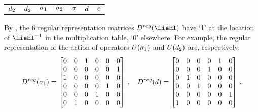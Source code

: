 {\begin{table}[h]
\begin{center}
\begin{tabular}{c | c c c c c c}
      $d_2$ & $d_2$ & $\sigma_1$ & $\sigma_2$ & $\sigma$ & $d$ & $e$
    \end{tabular}
  \end{center}
\end{table}
  By , the 6 regular representation matrices
  $D^{reg}(\LieEl)$ have `1' at the location of $\LieEl^{-1}$
  in the multiplication table, `0' elsewhere.
  For example, the regular representation of the action of
  operators $U(\sigma_1)$ and
  $U(d_2)$ are, respectively:
  \[
    D^{reg}(\sigma_1) =
    \begin{bmatrix}
      0 & 0 & 1 & 0 & 0 & 0 \\
      0 & 0 & 0 & 0 & 0 & 1 \\
      1 & 0 & 0 & 0 & 0 & 0 \\
      0 & 0 & 0 & 0 & 1 & 0 \\
      0 & 0 & 0 & 1 & 0 & 0 \\
      0 & 1 & 0 & 0 & 0 & 0
    \end{bmatrix}
    \,,\quad
    D^{reg}(d) =
    \begin{bmatrix}
      0 & 0 & 0 & 0 & 1 & 0 \\
      0 & 0 & 0 & 1 & 0 & 0 \\
      0 & 1 & 0 & 0 & 0 & 0 \\
      0 & 0 & 1 & 0 & 0 & 0 \\
      0 & 0 & 0 & 0 & 0 & 1 \\
      1 & 0 & 0 & 0 & 0 & 0
    \end{bmatrix}
    \,.
  \]
\authorXD{}
} %
